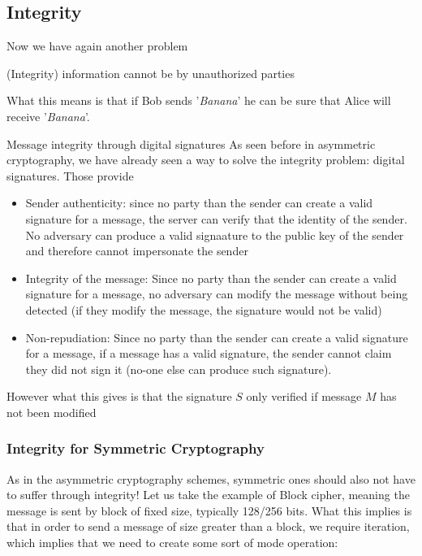 \subsection{Integrity}

Now we have again another problem  
\begin{definition}{(Integrity)}
information cannot be  by unauthorized parties
\end{definition}

What this means is that if Bob sends '\textit{Banana}' he can be sure that Alice will receive '\textit{Banana}'.
\begin{parag}{Message integrity through digital signatures}
    As seen before in asymmetric cryptography, we have already seen a way to solve the integrity problem: digital signatures. Those provide 
	\begin{itemize}
	    \item Sender authenticity: since no party than the sender can create a valid signature for a message, the server can verify that the identity of the sender. No adversary can produce a valid signaature to the public key of the sender and therefore cannot impersonate the sender
	    \item Integrity of the message: Since no party than the sender can create a valid signature for a message, no adversary can modify the message without being detected (if they modify the message, the signature would not be valid)
	    \item Non-repudiation: Since no party than the sender can create a valid signature for a message, if a message has a valid signature, the sender cannot claim they did not sign it (no-one else can produce such signature).
	\end{itemize}
	However what this gives is that the signature $S$ only verified if message $M$ has not been modified
\end{parag}

\subsubsection{Integrity for Symmetric Cryptography}
    As in the asymmetric cryptography schemes, symmetric ones should also not have to suffer through integrity! Let us take the example of Block cipher,  meaning the message is sent by block of fixed size, typically 128/256 bits. What this implies is that in order to send a message of size greater than a block, we require iteration, which implies that we need to create some sort of mode operation:

